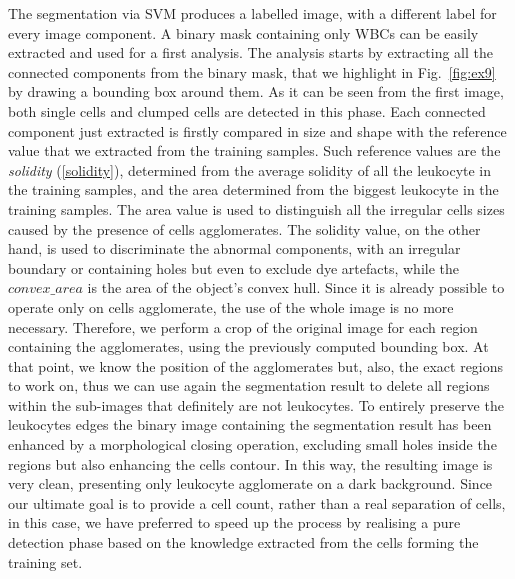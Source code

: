 \documentclass[final,a4paper,12pt,english]{UnicaPhdThesis3}
\begin{document}
	The segmentation via SVM produces a labelled image, with a different label for every image component. A binary mask containing only WBCs can be easily extracted and used for a first analysis. The analysis starts by extracting all the connected components from the binary mask, that we highlight in Fig.~\ref{fig:ex9} by drawing a bounding box around them. As it can be seen from the first image, both single cells and clumped cells are detected in this phase.
	Each connected component just extracted is firstly compared in size and shape with the reference value that we extracted from the training samples. Such reference values are the \textit{solidity} (\ref{solidity}), determined from the average solidity of all the leukocyte in the training samples, and the area determined from the biggest leukocyte in the training samples. The area value is used to distinguish all the irregular cells sizes caused by the presence of cells agglomerates. The solidity value, on the other hand, is used to discriminate the abnormal components, with an irregular boundary or containing holes but even to exclude dye artefacts, while the $convex\_area$ is the area of the object's convex hull. Since it is already possible to operate only on cells agglomerate, the use of the whole image is no more necessary. Therefore, we perform a crop of the original image for each region containing the agglomerates, using the previously computed bounding box. At that point, we know the position of the agglomerates but, also, the exact regions to work on, thus we can use again the segmentation result to delete all regions within the sub-images that definitely are not leukocytes. 
	To entirely preserve the leukocytes edges the binary image containing the segmentation result has been enhanced by a morphological closing operation, excluding small holes inside the regions but also enhancing the cells contour. In this way, the resulting image is very clean, presenting only leukocyte agglomerate on a dark background. Since our ultimate goal is to provide a cell count, rather than a real separation of cells, in this case, we have preferred to speed up the process by realising a pure detection phase based on the knowledge extracted from the cells forming the training set. 
\end{document}
